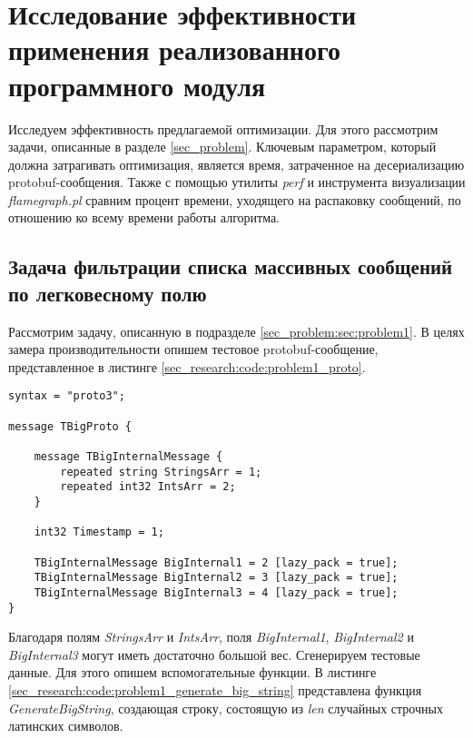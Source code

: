 \section{Исследование эффективности применения реализованного программного модуля}

Исследуем эффективность предлагаемой оптимизации. Для этого рассмотрим задачи, описанные в разделе \ref{sec_problem}.
Ключевым параметром, который должна затрагивать оптимизация, является время, затраченное на десериализацию protobuf-сообщения.
Также с помощью утилиты \textit{perf} и инструмента визуализации \textit{flamegraph.pl} сравним процент времени, уходящего на распаковку сообщений, по отношению ко всему времени работы алгоритма.

\subsection{Задача фильтрации списка массивных сообщений по легковесному полю}

Рассмотрим задачу, описанную в подразделе \ref{sec_problem:sec:problem1}.
В целях замера производительности опишем тестовое protobuf-сообщение, представленное в листинге \ref{sec_research:code:problem1_proto}.

\noindent\begin{minipage}{\linewidth}
\begin{lstlisting}[style=CodeListing, caption={Тестовое protobuf-сообщение}, label=sec_research:code:problem1_proto]
syntax = "proto3";

message TBigProto {

    message TBigInternalMessage {
        repeated string StringsArr = 1;
        repeated int32 IntsArr = 2;
    }

    int32 Timestamp = 1;

    TBigInternalMessage BigInternal1 = 2 [lazy_pack = true];
    TBigInternalMessage BigInternal2 = 3 [lazy_pack = true];
    TBigInternalMessage BigInternal3 = 4 [lazy_pack = true];
}
\end{lstlisting}
\end{minipage}

Благодаря полям \textit{StringsArr} и \textit{IntsArr}, поля \textit{BigInternal1}, \textit{BigInternal2} и \textit{BigInternal3} могут иметь достаточно большой вес.
Сгенерируем тестовые данные. Для этого опишем вспомогательные функции. В листинге \ref{sec_research:code:problem1_generate_big_string} представлена функция \textit{GenerateBigString}, создающая строку, состоящую из \textit{len} случайных строчных латинских символов.

